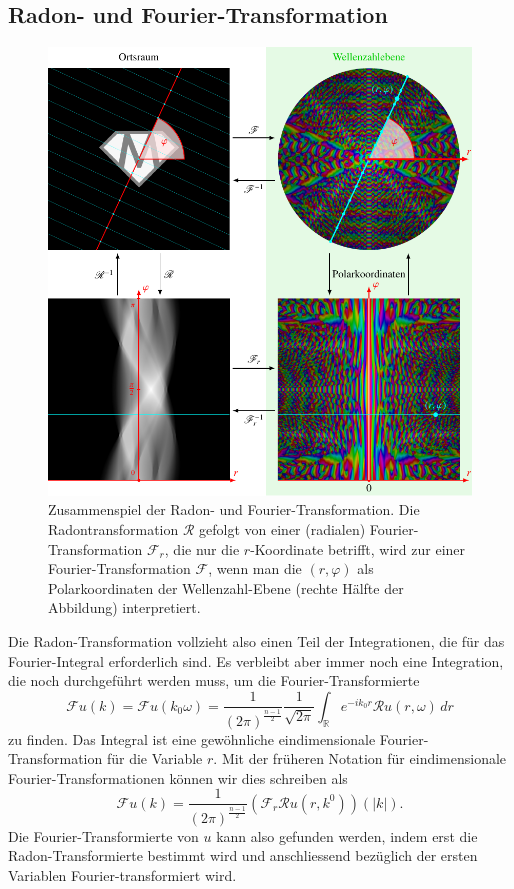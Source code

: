 \subsection{Radon- und Fourier-Transformation
\label{buch:radon:definition:subsection:radonfourier}}
\begin{figure}
\centering
\includegraphics[width=\textwidth]{chapters/050-radon/images/radonft.pdf}
\caption{Zusammenspiel der Radon- und Fourier-Transformation.
Die Radontransformation $\mathscr{R}$ gefolgt von einer (radialen)
Fourier-Transformation $\mathscr{F}_r$, die nur die $r$-Koordinate
betrifft, wird zur einer Fourier-Transformation $\mathscr{F}$, wenn
man die $(r,\varphi)$ als Polarkoordinaten der Wellenzahl-Ebene
(rechte Hälfte der Abbildung) interpretiert.
\label{buch:radon:definition:fig:radonft}}
\end{figure}
Die Radon-Transformation vollzieht also einen Teil der Integrationen,
die für das Fourier-Integral erforderlich sind.
Es verbleibt aber immer noch eine Integration, die noch
durchgeführt werden muss, um die Fourier-Transformierte
\[
\mathscr{F}u(k)
=
\mathscr{F}u(k_0\omega)
=
\frac{1}{(2\pi)^{\frac{n-1}2}}
\frac{1}{\!\sqrt{2\pi}}
\int_{\mathbb{R}}
e^{-ik_0r}
\mathscr{R}u(r,\omega)\,dr
\]
zu finden.
Das Integral ist eine gewöhnliche eindimensionale Fourier-Transformation
für die Variable $r$.
Mit der früheren Notation für eindimensionale Fourier-Transformationen
können wir dies schreiben als
\begin{equation}
\mathscr{F}u(k)
=
\frac{1}{(2\pi)^{\frac{n-1}2}}
(\mathscr{F}_r \mathscr{R}u(r,k^0))(|k|).
\label{buch:radon:definitionb:eqn:fr}
\end{equation}
Die Fourier-Transformierte von $u$ kann also gefunden werden,
indem erst die Radon-Transformierte bestimmt wird und anschliessend
bezüglich der ersten Variablen Fourier-transformiert wird.

